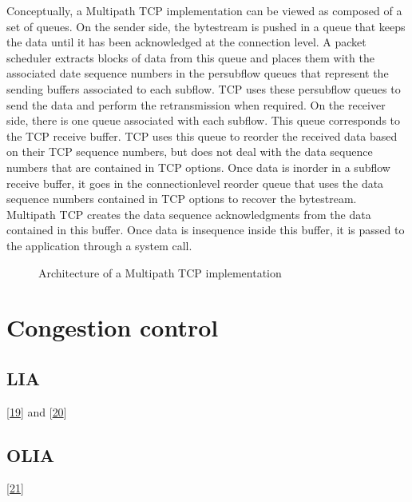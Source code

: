 \documentclass[letterpaper,10pt,english]{sphinxmanual}
\begin{document}
Conceptually, a Multipath TCP implementation can be viewed as composed of a set of queues. On the sender side, the bytestream is pushed in a queue that keeps the data until it has been acknowledged at the connection level. A packet scheduler extracts blocks of data from this queue and places them with the associated date sequence numbers in the per\sphinxhyphen{}subflow queues that represent the sending buffers associated to each subflow. TCP uses these per\sphinxhyphen{}subflow queues to send the data and perform the retransmission when required. On the receiver side, there is one queue associated with each subflow. This queue corresponds to the TCP receive buffer. TCP uses this queue to reorder the received data based on their TCP sequence numbers, but does not deal with the data sequence numbers that are contained in TCP options. Once data is in\sphinxhyphen{}order in a subflow receive buffer, it goes in the connection\sphinxhyphen{}level reorder queue that uses the data sequence numbers contained in TCP options to recover the bytestream. Multipath TCP creates the data sequence acknowledgments from the data contained in this buffer. Once data is in\sphinxhyphen{}sequence inside this buffer, it is passed to the application through a  system call.
\begin{figure}[htbp]\centering\capstart{}\caption{Architecture of a Multipath TCP implementation}\label{\detokenize{mptcp:id72}}\end{figure}

\section{Congestion control}
\label{\detokenize{mptcp:congestion-control}}\label{\detokenize{mptcp:mptcp-congestion}}

\subsection{LIA}
\label{\detokenize{mptcp:lia}}
\sphinxAtStartPar
{[}\hyperlink{cite.biblio:id8932}{19}{]} and {[}\hyperlink{cite.biblio:id6203}{20}{]}


\subsection{OLIA}
\label{\detokenize{mptcp:olia}}
\sphinxAtStartPar
{[}\hyperlink{cite.biblio:id8951}{21}{]}
\end{document}
